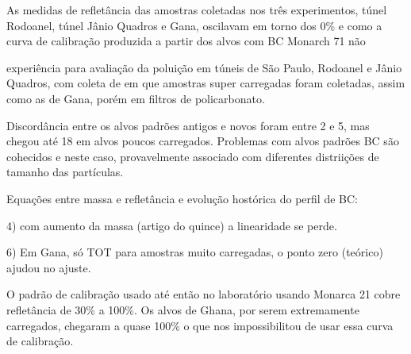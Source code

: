  

As medidas de refletância das amostras coletadas nos três experimentos, 
túnel Rodoanel, túnel Jânio Quadros e Gana, oscilavam em torno dos 0\% e como
a curva de calibração produzida a partir dos alvos com BC Monarch 71 não

experiência para avaliação da poluição em túneis de São Paulo, 
Rodoanel e Jânio Quadros, com coleta de   em que amostras super carregadas foram coletadas, 
assim como as de Gana, porém em filtros de policarbonato.


Discordância entre os alvos padrões antigos e novos foram entre 2 e 5, mas chegou 
até 18 em alvos poucos carregados. Problemas com alvos padrões BC são cohecidos e 
neste caso, provavelmente associado com diferentes distriições de tamanho das partículas.





Equações entre massa e refletância e evolução hostórica do perfil de BC:

4) com aumento da massa (artigo do quince) a linearidade se perde. 



6) Em Gana, só TOT para amostras muito carregadas, o ponto zero (teórico)
ajudou no ajuste.

O padrão de calibração usado até então no laboratório usando Monarca 21 cobre refletância de 30\% a 100\%. 
Os alvos de Ghana, por serem extremamente carregados, chegaram a quase 100\% o que nos impossibilitou de usar 
essa curva de calibração.  

